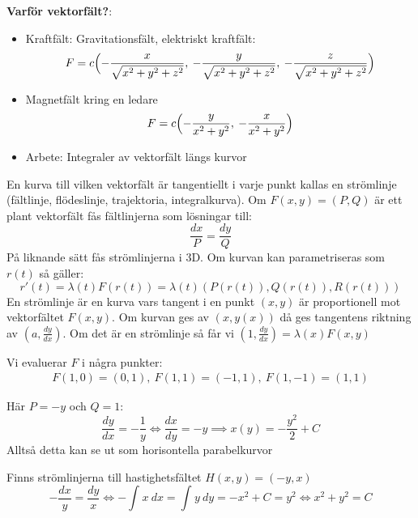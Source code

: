 \documentclass{report}
\begin{document}
\noindent
\textbf{Varför vektorfält?}:
\begin{itemize}
	\item Kraftfält: Gravitationsfält, elektriskt kraftfält:
	\begin{equation*}
		F = c\Bigl( -\frac{x}{ \sqrt{x^2+y^2+z^2}  }, \: - \frac{y}{ \sqrt{x^2+y^2+z^2} }, \: - \frac{z}{ \sqrt{x^2+y^2+z^2} }     \Bigr)
	\end{equation*}
	\item Magnetfält kring en ledare
	\begin{equation*}
	F = c \Bigl( - \frac{y}{x^2+y^2}, \: - \frac{x}{x^2+y^2}    \Bigr)
	\end{equation*}
	\item Arbete: Integraler av vektorfält längs kurvor 
\end{itemize}

{
En kurva till vilken vektorfält är tangentiellt i varje punkt kallas en strömlinje (fältlinje, flödeslinje, trajektoria, integralkurva). Om $ F(x,y) = (P, Q) $ är ett plant vektorfält fås fältlinjerna som lösningar till:
\begin{equation*}
\frac{dx}{P} = \frac{dy}{Q} 
\end{equation*}
På liknande sätt fås strömlinjerna i 3D. Om kurvan kan parametriseras som $ r(t) $ så gäller:
\begin{equation*}
r'(t) = \lambda (t) F(r(t)) = \lambda (t) (P(r(t)), Q(r(t)), R(r(t)))
\end{equation*}
En strömlinje är en kurva vars tangent i en punkt $ (x,y) $ är proportionell mot vektorfältet $ F(x,y) $. Om kurvan ges av $ (x, y(x)) $ då ges tangentens riktning av $ (a, \frac{dy}{dx} ) $. Om det är en strömlinje så får vi $ (1, \frac{dy}{dx} ) = \lambda(x) F(x,y) $ 
}

{
Vi evaluerar $ F $ i några punkter:
\begin{align*}
F(1,0) = (0,1), \: F(1,1) = (-1,1), \: F(1,-1) = (1,1)
\end{align*}

Här $ P = -y $ och $ Q = 1 $:
\begin{equation*}
\frac{dy}{dx} = - \frac{1}{y} \iff \frac{dx}{dy} = -y \implies x(y) = -\frac{y^2}{2} + C  
\end{equation*}
Alltså detta kan se ut som horisontella parabelkurvor 
}

\qs{}
{
Finns strömlinjerna till hastighetsfältet $ H(x,y) = (-y,x) $
}
\sol 
\begin{equation*}
	-\frac{dx}{y} = \frac{dy}{x} \iff -\int_{}^{} x \: dx = \int_{}^{} y \: dy = -x^2 + C = y^2 \iff x^2+y^2 = C  
\end{equation*}
\end{document}
